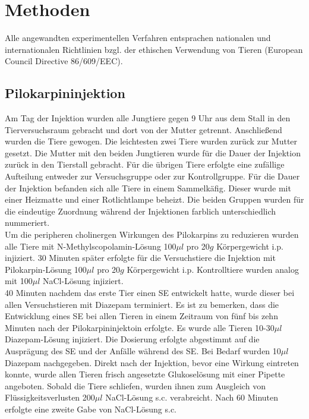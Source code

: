 \documentclass[a4paper,11pt]{report}
\begin{document}
{\section{Methoden}
Alle angewandten experimentellen Verfahren entsprachen nationalen und internationalen Richtlinien bzgl. der ethischen Verwendung von Tieren (European Council Directive 86/609/EEC).
\subsection{Pilokarpininjektion}
Am Tag der Injektion wurden alle Jungtiere gegen 9 Uhr aus dem Stall in den Tierversuchsraum gebracht und dort von der Mutter getrennt. Anschließend wurden die Tiere gewogen. Die leichtesten  zwei Tiere wurden zurück zur Mutter gesetzt. Die Mutter mit den beiden Jungtieren wurde für die Dauer der Injektion zurück in den Tierstall gebracht.  Für die übrigen Tiere erfolgte eine zufällige Aufteilung entweder zur Versuchsgruppe oder zur Kontrollgruppe.  Für die Dauer der Injektion befanden sich alle Tiere in einem Sammelkäfig. Dieser wurde mit einer Heizmatte und einer Rotlichtlampe beheizt. Die beiden Gruppen wurden für die eindeutige Zuordnung während der Injektionen farblich unterschiedlich nummeriert. \\

Um die peripheren cholinergen Wirkungen des Pilokarpins zu reduzieren wurden alle Tiere mit N-Methylscopolamin-Lösung 100$\mu l$ pro 20$g$ Körpergewicht i.p. injiziert. 30 Minuten später erfolgte für die Versuchstiere die Injektion mit Pilokarpin-Lösung 100$\mu l$ pro 20$g$ Körpergewicht i.p. Kontrolltiere wurden analog mit 100$\mu l$ NaCl-Lösung injiziert.\\

40 Minuten nachdem das erste Tier einen SE entwickelt hatte, wurde dieser bei allen Versuchstieren mit Diazepam terminiert. Es ist zu bemerken, dass die Entwicklung eines SE bei allen Tieren in einem Zeitraum von fünf bis zehn Minuten nach der Pilokarpininjektoin erfolgte. Es wurde alle Tieren 10-30$\mu l$ Diazepam-Lösung injiziert. Die Dosierung erfolgte abgestimmt auf die Ausprägung des SE und der Anfälle während des SE. Bei Bedarf wurden 10$\mu l$ Diazepam nachgegeben. Direkt nach der Injektion, bevor eine Wirkung eintreten konnte, wurde allen Tieren frisch angesetzte Glukoselösung mit einer Pipette angeboten. Sobald die Tiere schliefen, wurden ihnen zum Ausgleich von Flüssigkeitsverlusten 200$\mu l$ NaCl-Lösung s.c. verabreicht. Nach 60 Minuten erfolgte eine zweite Gabe von NaCl-Lösung s.c. \\

}
\end{document}
